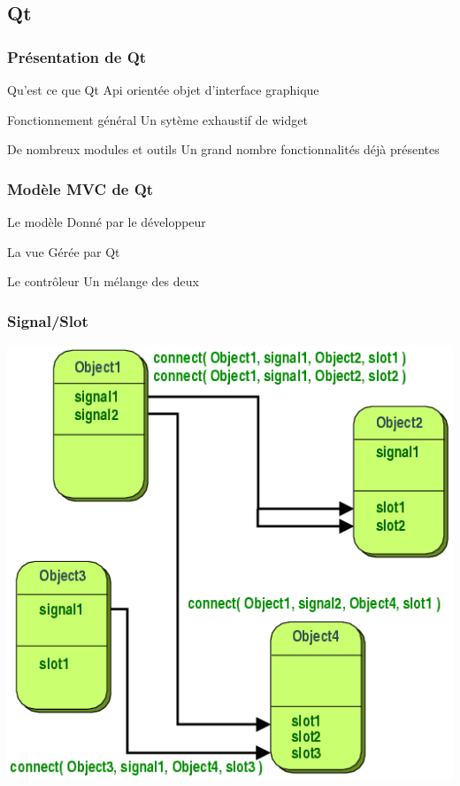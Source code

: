 \documentclass{beamer}
\begin{document}
        \subsection{Qt}
	\begin{frame}
	  \frametitle{Présentation de Qt}
          \begin{block}{Qu'est ce que Qt}
            Api orientée objet d'interface graphique
          \end{block}
          \pause
          \begin{block}{Fonctionnement général}
            Un sytème exhaustif de widget
          \end{block}
          \pause
          \begin{block}{De nombreux modules et outils}
            Un grand nombre fonctionnalités déjà présentes
          \end{block}{}
	\end{frame}

        \begin{frame}
          \frametitle{Modèle MVC de Qt}
          \begin{block}{Le modèle}
            Donné par le développeur
          \end{block}
          \pause
          \begin{block}{La vue}
            Gérée par Qt
          \end{block}
          \pause
          \begin{block}{Le contrôleur}
            Un mélange des deux
          \end{block}
        \end{frame}

        \begin{frame}
          \frametitle{Signal/Slot}
          \center
          \includegraphics[scale=0.35]{images/abstract-connections.png}
        \end{frame}
\end{document}
